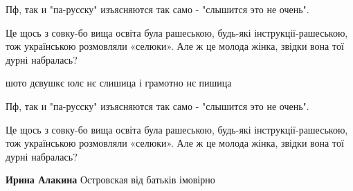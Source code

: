 \begin{itemize}
 
Пф, так и "па-русску" изъясняются так само - "слышится это не очень".

 

Це щось з совку-бо вища освіта була рашеською, будь-які інструкції-рашеською, тож
українською розмовляли «селюки». Але ж це молода жінка, звідки вона тої дурні
набралась?

\end{itemize}
 

шото дєвушкє юлє нє слишица і грамотно нє пишица

 
Пф, так и "па-русску" изъясняются так само - "слышится это не очень".

 

Це щось з совку-бо вища освіта була рашеською, будь-які інструкції-рашеською, тож
українською розмовляли «селюки». Але ж це молода жінка, звідки вона тої дурні
набралась?

\begin{itemize}
 
\textbf{Ирина Алакина} Островская від батьків імовірно
\end{itemize}

 
